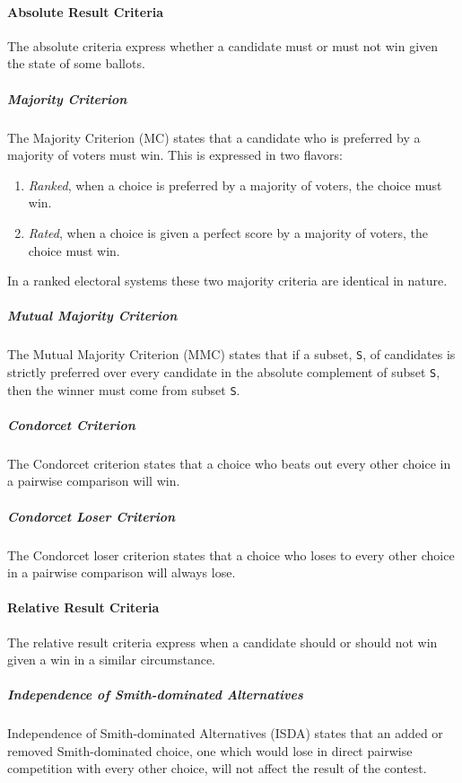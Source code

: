 \paragraph{Absolute Result Criteria}
The absolute criteria express whether a candidate must or must not win given the
state of some ballots.\cite{range-voting-criteria,electoral-system-comparison,electoral-system-comparison-archive}

\subparagraph{Majority Criterion}
The Majority Criterion (MC) states that a candidate who is preferred by a
majority of voters must win. This is expressed in two flavors:
\begin{enumerate}
    \item \emph{Ranked}, when a choice is preferred by a majority of voters,
        the choice must win.
    \item \emph{Rated}, when a choice is given a perfect score by a majority of
        voters, the choice must win.
\end{enumerate}
In a ranked electoral systems these two majority criteria are identical in
nature.

\subparagraph{Mutual Majority Criterion}
The Mutual Majority Criterion (MMC) states that if a subset, \verb|S|, of
candidates is strictly preferred over every candidate in the absolute complement
of subset \verb|S|, then the winner must come from subset \verb|S|.

\subparagraph{Condorcet Criterion}
The Condorcet criterion states that a choice who beats out every other choice in
a pairwise comparison will win.

\subparagraph{Condorcet Loser Criterion}
The Condorcet loser criterion states that a choice who loses to every other
choice in a pairwise comparison will always lose.

\paragraph{Relative Result Criteria}
The relative result criteria express when a candidate should or should not win
given a win in a similar circumstance.\cite{electoral-system-comparison,electoral-system-comparison-archive,range-voting-criteria}

\subparagraph{Independence of Smith-dominated Alternatives}
Independence of Smith-dominated Alternatives (ISDA) states that an added or
removed Smith-dominated choice, one which would lose in direct pairwise
competition with every other choice, will not affect the result of the contest.


